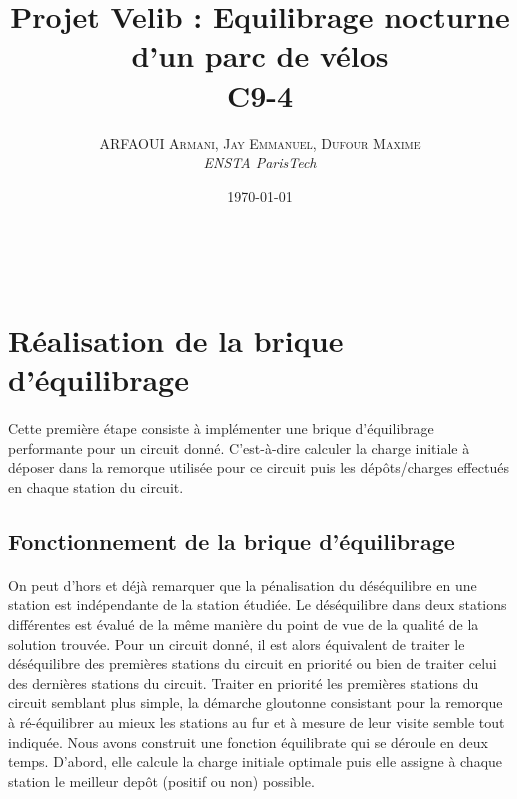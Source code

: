 \documentclass[a4paper, 11pt]{article} %
\title{\textbf{Projet Velib : Equilibrage nocturne d'un parc de vélos}\\ %
C9-4} %
\author{\textsc{ARFAOUI Armani, Jay Emmanuel, Dufour Maxime} %
\\{\textit{ENSTA ParisTech}}} %
\date{\today} %
\makeatletter
\renewcommand{\maketitle}{ %
\begin{flushright} %
{\LARGE\@title} %

\vspace{30pt} %

{\large\@author} %
\\\@date %

\vspace{20pt} %
\end{flushright}
}
\makeatother
\begin{document}
\vspace{200pt}

\maketitle %

\section{Réalisation de la brique d'équilibrage}

\paragraph*{}
Cette première étape consiste à implémenter une brique d'équilibrage performante pour un circuit donné. C'est-à-dire calculer la charge initiale à déposer dans la remorque utilisée pour ce circuit puis les dépôts/charges effectués en chaque station du circuit.

\subsection{Fonctionnement de la brique d'équilibrage}

\paragraph*{}
On peut d'hors et déjà remarquer que la pénalisation du déséquilibre en une station est indépendante de la station étudiée. Le déséquilibre dans deux stations différentes est évalué de la même manière du point de vue de la qualité de la solution trouvée. Pour un circuit donné, il est alors équivalent de traiter le déséquilibre des premières stations du circuit en priorité ou bien de traiter celui des dernières stations du circuit. Traiter en priorité les premières stations du circuit semblant plus simple, la démarche gloutonne consistant pour la remorque à ré-équilibrer au mieux les stations au fur et à mesure de leur visite semble tout indiquée. Nous avons construit une fonction équilibrate qui se déroule en deux temps. D'abord, elle calcule la charge initiale optimale puis elle assigne à chaque station le meilleur depôt (positif ou non) possible. 
\end{document}

